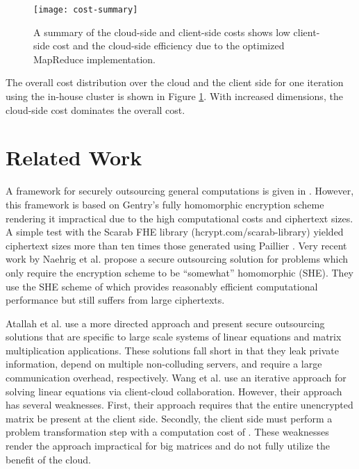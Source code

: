 \documentclass[10pt, conference, compsocconf]{IEEEtran}
\begin{document}
\begin{figure}[tbh]
\centering
\begin{minipage}{.9\linewidth}
\centering
\texttt{[image: cost-summary]}
\vspace{-0.75cm}
\caption{ A summary of the cloud-side and client-side costs shows low client-side cost and the cloud-side efficiency due to the optimized MapReduce implementation. \newline }
\label{fig:cost-summary}
\end{minipage}
\end{figure}
\vspace{-0.5cm}

The overall cost distribution over the cloud and the client side for one iteration using the in-house cluster is shown in Figure \ref{fig:cost-summary}. With increased dimensions, the cloud-side cost dominates the overall cost.

   

\section{Related Work}\label{sec:related}
A framework for securely outsourcing general computations is given in \cite{gennaro10}.  However, this framework is based on Gentry's fully homomorphic encryption scheme \cite{gentry09} rendering it impractical due to the high computational costs and ciphertext sizes.  A simple test with the Scarab FHE library (hcrypt.com/scarab-library)  yielded ciphertext sizes more than ten times those generated using Paillier \cite{paillier99}.  Very recent work by Naehrig et al. \cite{naehrig11} propose a secure outsourcing solution for problems which only require the encryption scheme to be ``somewhat'' homomorphic (SHE).  They use the SHE scheme of \cite{bv11a} which provides reasonably efficient computational performance but still suffers from large ciphertexts.

Atallah et al. \cite{atallah10} use a more directed approach and present secure outsourcing solutions that are specific to large scale systems of linear equations and matrix multiplication applications.  These solutions fall short in that they leak private information, depend on multiple non-colluding servers, and require a large communication overhead, respectively.  Wang et al. \cite{wang11} use an iterative approach for solving linear equations via client-cloud collaboration.  However, their approach has several  weaknesses.  First, their approach requires that the entire unencrypted matrix be present at the client side.  Secondly, the client side must perform a problem transformation step with a computation cost of .  These weaknesses render the approach impractical for big matrices and do not fully utilize the benefit of the cloud.  
\end{document}
